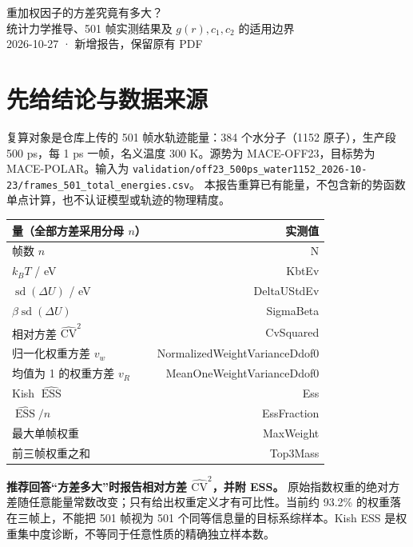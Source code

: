 \documentclass[11pt,a4paper]{article}
\newcommand{\ESS}{\operatorname{ESS}}
\begin{document}
\begin{center}{\LARGE 重加权因子的方差究竟有多大？}\\[8pt]
{\large 统计力学推导、501 帧实测结果及 $g(r),c_1,c_2$ 的适用边界}\\[6pt]
2026-10-27 · 新增报告，保留原有 PDF\end{center}
\section{先给结论与数据来源}
复算对象是仓库上传的 501 帧水轨迹能量：384 个水分子（1152 原子），生产段 500 ps，每 1 ps 一帧，名义温度 300 K。源势为 MACE-OFF23，目标势为 MACE-POLAR。输入为
\texttt{validation/off23\_500ps\_water1152\_2026-10-23/frames\_501\_total\_energies.csv}。
本报告重算已有能量，不包含新的势函数单点计算，也不认证模型或轨迹的物理精度。

\begin{center}\begin{tabular}{lr}\toprule
量（全部方差采用分母 $n$） & 实测值\\\midrule
帧数 $n$ & \csname N\endcsname\\
$k_BT$ / eV & \csname KbtEv\endcsname\\
$\operatorname{sd}(\Delta U)$ / eV & \csname DeltaUStdEv\endcsname\\
$\beta\operatorname{sd}(\Delta U)$ & \csname SigmaBeta\endcsname\\
相对方差 $\widehat{\mathrm{CV}}^2$ & \csname CvSquared\endcsname\\
归一化权重方差 $v_w$ & \csname NormalizedWeightVarianceDdof0\endcsname\\
均值为 1 的权重方差 $v_R$ & \csname MeanOneWeightVarianceDdof0\endcsname\\
Kish $\widehat{\ESS}$ & \csname Ess\endcsname\\
$\widehat{\ESS}/n$ & \csname EssFraction\endcsname\\
最大单帧权重 & \csname MaxWeight\endcsname\\
前三帧权重之和 & \csname Top3Mass\endcsname\\\bottomrule
\end{tabular}\end{center}
\textbf{推荐回答“方差多大”时报告相对方差 $\widehat{\mathrm{CV}}^2$，并附 ESS。}
原始指数权重的绝对方差随任意能量常数改变；只有给出权重定义才有可比性。当前约 93.2\% 的权重落在三帧上，不能把 501 帧视为 501 个同等信息量的目标系综样本。Kish ESS 是权重集中度诊断，不等同于任意性质的精确独立样本数。
\newpage
\end{document}

